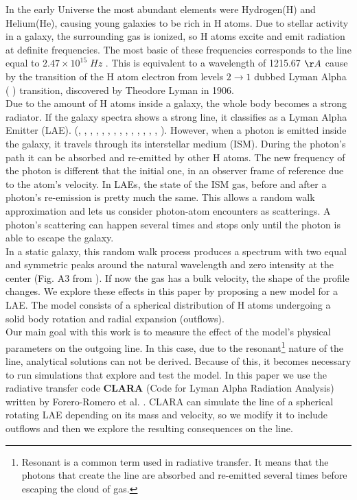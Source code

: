 \documentclass[twocolappendix]{latex/emulateapj}
\begin{document}
In the early Universe the most abundant elements were Hydrogen(H) and Helium(He), causing young galaxies to be rich in H atoms. Due to stellar activity in a galaxy, the surrounding gas is ionized, so H atoms excite and emit radiation at definite frequencies. The most basic of these frequencies corresponds to the \lya line equal to $2.47 \times 10^{15}\;Hz$ \cite{PartridgePeebles}. This is equivalent to a wavelength of 1215.67 $\AA$ cause by the transition of the H atom electron from levels $2\rightarrow1$ dubbed Lyman Alpha ( \lya) transition, discovered by Theodore Lyman in 1906. \cite{LymanBio} \\

Due to the amount of H atoms inside a galaxy, the whole body becomes a strong \lya radiator. If the galaxy spectra shows a strong \lya line, it classifies as a Lyman Alpha Emitter (LAE). (\cite{DjorgovskiThompson}, \cite{Rhoads00}, \cite{Gawiser2007}, \cite{Koehler2007}, \cite{Ouchi08}, \cite{Yamada2012}, \cite{Schenker2012}, \cite{Kulas12}, \cite{Yamada2012}, \cite{Chonis2013}, \cite{Finkelstein2013}, \cite{Ostlin14}, \cite{Hayes2014}, \cite{Faisst2014}, \cite{Fumagalli2015}). However, when a \lya photon is emitted inside the galaxy, it travels through its interstellar medium (ISM). During the photon's path it can be absorbed and re-emitted by other H atoms. The new frequency of the photon is different that the initial one, in an observer frame of reference due to the atom's velocity. In LAEs, the state of the ISM gas, before and after a photon's re-emission is pretty much the same. This allows a random walk approximation and lets us consider photon-atom encounters as scatterings. A photon's scattering can happen several times and stops only until the photon is able to escape the galaxy. \\

In a static galaxy, this random walk process produces a spectrum with two equal and symmetric peaks around the natural \lya wavelength and zero intensity at the center (Fig. A3 from \cite{CLARA}). If now the gas has a bulk velocity, the shape of the \lya profile changes. We explore these effects in this paper by proposing a new model for a LAE. The model consists of a spherical distribution of H atoms undergoing a solid body rotation and radial expansion (outflows). \\

Our main goal with this work is to measure the effect of the model's physical parameters on the outgoing \lya line. In this case, due to the resonant\footnote{Resonant is a common term used in radiative transfer. It means that the photons that create the line are absorbed and re-emitted several times before escaping the cloud of gas.} nature of the \lya line, analytical solutions can not be derived. Because of this, it becomes necessary to run simulations that explore and test the model. In this paper we use the radiative transfer code \textbf{CLARA} (Code for Lyman Alpha Radiation Analysis) written by Forero-Romero et al. \cite{CLARA}. CLARA can simulate the \lya line of a spherical rotating LAE depending on its mass and velocity, so we modify it to include outflows and then we explore the resulting consequences on the \lya line. \\
\end{document}

